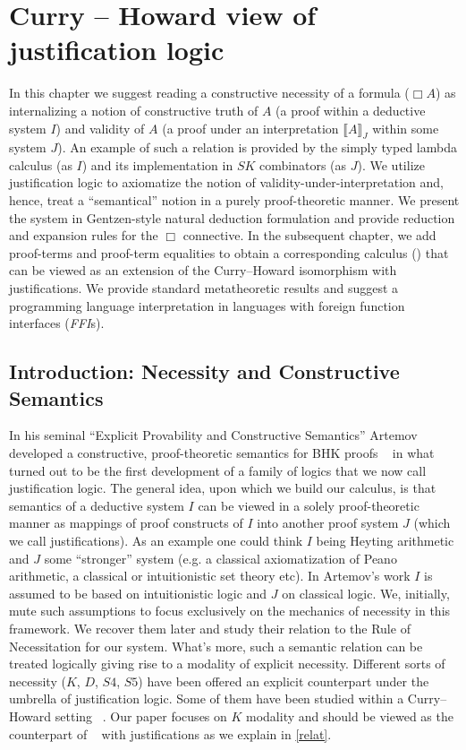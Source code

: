 \chapter{Curry -- Howard view of justification logic}
\label{proposal}
In this chapter we suggest reading a constructive necessity  of a formula ($\Box A$) as  internalizing a notion of 
constructive truth of $A$ 
(a proof within a deductive system $I$) and validity of $A$
(a proof under an interpretation  $\llbracket A \rrbracket_J$ within some system $J$).  
An example of such a relation is provided by the simply typed lambda calculus
(as $I$) and its implementation in $SK$ combinators (as $J$). 
We utilize justification logic to axiomatize the notion of 
validity-under-interpretation and, hence, treat  a  ``semantical'' notion in a purely proof-theoretic manner. 
We present the system  in 
Gentzen-style  natural deduction formulation  and provide reduction and expansion rules for the $\Box$ connective. 
In the subsequent chapter, we add proof-terms and proof-term equalities
to obtain a corresponding calculus ({}) that can be viewed as an extension of the Curry--Howard isomorphism with justifications.
We provide standard metatheoretic results  and suggest a 
programming language  interpretation in  languages with foreign function interfaces (\textit{FFI}s).

\section{Introduction: Necessity and Constructive Semantics}
In his seminal ``Explicit Provability and Constructive Semantics'' \cite{Artemov2001} 
Artemov developed a constructive, proof-theoretic semantics for 
\acs{BHK} proofs ~\cite{Troelstra1988} 
in what turned out to be the first development of a family of logics that we now call justification logic.
The general idea, upon which we build our calculus, is that semantics of a deductive system $I$ can be 
viewed in a solely proof-theoretic manner 
as mappings of proof constructs of $I$ into another proof system $J$ (which we call justifications).
As an example one could think  $I$  being  Heyting arithmetic and $J$ some  ``stronger'' system 
(e.g. a classical axiomatization of Peano arithmetic, a classical or intuitionistic set theory etc). 
 In Artemov's work $I$ is assumed to be
based on intuitionistic logic and $J$  on classical logic. 
We, initially,  mute such assumptions to focus exclusively on the mechanics of necessity in this framework.
We recover them later and study  their relation  to  the Rule of Necessitation for our system.
What's more,  such a semantic relation can be treated logically giving  rise to a modality of explicit necessity. 
Different sorts of necessity
($K$, $D$, $S4$, $S5$) have been offered  an explicit counterpart under the umbrella of justification logic. 
Some of them have been studied within a
Curry--Howard setting ~\cite{ArtBon07LFCS}. Our paper
focuses on  $K$ modality and  should be viewed as the  counterpart of ~\cite{Bellin2001} with justifications as we explain in \ref{relat}.
